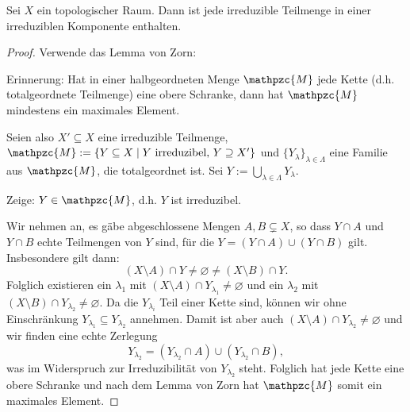 \documentclass[a4paper,12pt]{scrbook}
\newtheorem{proof}{Beweis}
\def\M{\mathpzc{M}}
\newcommand{\leer}{\ensuremath{\varnothing}}
\begin{document}
\begin{prop}\label{1.2.10} Sei $X$ ein topologischer Raum. Dann ist jede irreduzible Teilmenge in einer irreduziblen Komponente enthalten.\end{prop}
\begin{proof} Verwende das Lemma von Zorn:

{\sc Erinnerung:} Hat in einer halbgeordneten Menge $\M$ jede Kette (d.h. totalgeordnete Teilmenge) eine obere Schranke, dann hat $\M$ mindestens ein maximales Element.

Seien also $X'\subseteq X$ eine irreduzible Teilmenge, $\M:=\{Y\subseteq X\mid Y\text{ irreduzibel, }Y\supseteq X'\}$ und $\{Y_{\lambda}\}_{\lambda\in\Lambda}$ eine Familie aus $\M$, die totalgeordnet ist. Sei $\displaystyle Y:=\bigcup_{\lambda\in\Lambda}Y_{\lambda}$.

{\sc Zeige:} $Y\in\M$, d.h. $Y$ ist irreduzibel.

Wir nehmen an, es gäbe abgeschlossene Mengen $A,B\subsetneq X$, so dass $Y\cap A$ und $Y\cap B$ echte Teilmengen von $Y$ sind, für die $Y=(Y\cap A)\cup(Y\cap B)$ gilt. Insbesondere gilt dann:
\[(X\setminus A)\cap Y\neq\leer\neq (X\setminus B)\cap Y.\]
Folglich existieren ein $\lambda_{1}$ mit $(X\setminus A)\cap Y_{\lambda_{1}}\neq\leer$ und ein $\lambda_{2}$ mit $(X\setminus B)\cap Y_{\lambda_{2}}\neq\leer$. Da die $Y_{\lambda_{i}}$ Teil einer Kette sind, können wir ohne Einschränkung $Y_{\lambda_{1}}\subseteq Y_{\lambda_{2}}$ annehmen. Damit ist aber auch $(X\setminus A)\cap Y_{\lambda_{2}}\neq\leer$ und wir finden eine echte Zerlegung
\[Y_{\lambda_{2}}=(Y_{\lambda_{2}}\cap A)\cup(Y_{\lambda_{2}}\cap B),\]
was im Widerspruch zur Irreduzibilität von $Y_{\lambda_{2}}$ steht. Folglich hat jede Kette eine obere Schranke und nach dem Lemma von Zorn hat $\M$ somit ein maximales Element.
\end{proof}
\end{document}
